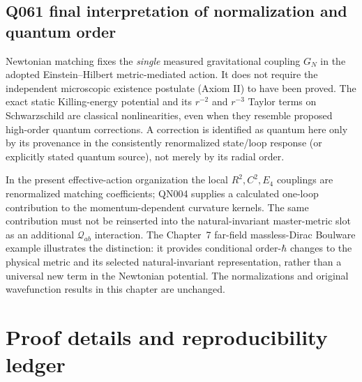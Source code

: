 \documentclass[11pt,a4paper,oneside]{report}
\numberwithin{equation}{chapter}
\theoremstyle{definition}\newtheorem{definition}[theorem]{Definition}
\theoremstyle{remark}\newtheorem{remark}[theorem]{Remark}
\begin{document}
\section*{Q061 final interpretation of normalization and quantum order}
\noindent Newtonian matching fixes the \emph{single} measured gravitational coupling $G_N$ in the adopted Einstein--Hilbert metric-mediated action. It does not require the independent microscopic existence postulate (Axiom II) to have been proved. The exact static Killing-energy potential and its $r^{-2}$ and $r^{-3}$ Taylor terms on Schwarzschild are classical nonlinearities, even when they resemble proposed high-order quantum corrections. A correction is identified as quantum here only by its provenance in the consistently renormalized state/loop response (or explicitly stated quantum source), not merely by its radial order.

\noindent In the present effective-action organization the local $R^2,C^2,E_4$ couplings are renormalized matching coefficients; QN004 supplies a calculated one-loop contribution to the momentum-dependent curvature kernels. The same contribution must not be reinserted into the natural-invariant master-metric slot as an additional $\mathcal Q_{ab}$ interaction. The Chapter~7 far-field massless-Dirac Boulware example illustrates the distinction: it provides conditional order-$\hbar$ changes to the physical metric and its selected natural-invariant representation, rather than a universal new term in the Newtonian potential. The normalizations and original wavefunction results in this chapter are unchanged.


\appendix
\chapter{Proof details and reproducibility ledger}\label{app:proof}
\end{document}
